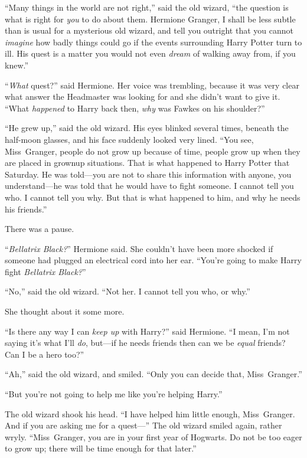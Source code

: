 “Many things in the world are not right,” said the old wizard, “the question is what is right for \emph{you} to do about them. Hermione Granger, I shall be less subtle than is usual for a mysterious old wizard, and tell you outright that you cannot \emph{imagine} how badly things could go if the events surrounding Harry Potter turn to ill. His quest is a matter you would not even \emph{dream} of walking away from, if you knew.”

“\emph{What} quest?” said Hermione. Her voice was trembling, because it was very clear what answer the Headmaster was looking for and she didn’t want to give it. “What \emph{happened} to Harry back then, \emph{why} was Fawkes on his shoulder?”

“He grew up,” said the old wizard. His eyes blinked several times, beneath the half-moon glasses, and his face suddenly looked very lined. “You see, Miss~Granger, people do not grow up because of time, people grow up when they are placed in grownup situations. That is what happened to Harry Potter that Saturday. He was told—you are not to share this information with anyone, you understand—he was told that he would have to fight someone. I cannot tell you who. I cannot tell you why. But that is what happened to him, and why he needs his friends.”

There was a pause.

“\emph{Bellatrix Black?}” Hermione said. She couldn’t have been more shocked if someone had plugged an electrical cord into her ear. “You’re going to make Harry fight \emph{Bellatrix Black?}”

“No,” said the old wizard. “Not her. I cannot tell you who, or why.”

She thought about it some more.

“Is there any way I can \emph{keep up} with Harry?” said Hermione. “I mean, I’m not saying it’s what I’ll \emph{do}, but—if he needs friends then can we be \emph{equal} friends? Can I be a hero too?”

“Ah,” said the old wizard, and smiled. “Only you can decide that, Miss~Granger.”

“But you’re not going to help me like you’re helping Harry.”

The old wizard shook his head. “I have helped him little enough, Miss~Granger. And if you are asking me for a quest—” The old wizard smiled again, rather wryly. “Miss~Granger, you are in your first year of Hogwarts. Do not be too eager to grow up; there will be time enough for that later.”

